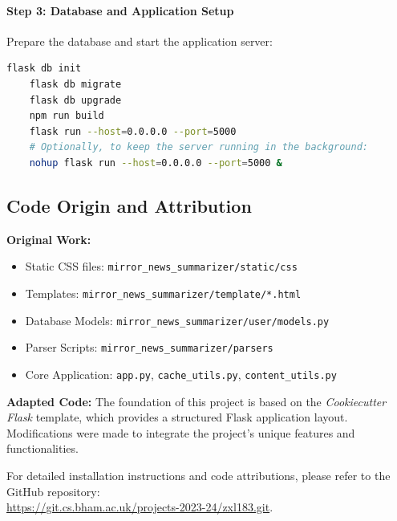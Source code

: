 \documentclass[10pt]{article}
\begin{document}
\begin{appendices}
    \paragraph{Step 3: Database and Application Setup}
    Prepare the database and start the application server:
    \begin{lstlisting}[language=bash]
    flask db init
    flask db migrate
    flask db upgrade
    npm run build
    flask run --host=0.0.0.0 --port=5000
    # Optionally, to keep the server running in the background:
    nohup flask run --host=0.0.0.0 --port=5000 &
    \end{lstlisting}
    
    \subsection{Code Origin and Attribution}
    \label{subsec:code_origin}
    
    \textbf{Original Work:}
    \begin{itemize}
        \item Static CSS files: \texttt{mirror\_news\_summarizer/static/css}
        \item Templates: \texttt{mirror\_news\_summarizer/template/*.html}
        \item Database Models: \texttt{mirror\_news\_summarizer/user/models.py}
        \item Parser Scripts: \texttt{mirror\_news\_summarizer/parsers}
        \item Core Application: \texttt{app.py}, \texttt{cache\_utils.py}, \texttt{content\_utils.py}
    \end{itemize}
    
    \textbf{Adapted Code:}
    The foundation of this project is based on the \textit{Cookiecutter Flask} template, which provides a structured Flask application layout. Modifications were made to integrate the project's unique features and functionalities.
    
    For detailed installation instructions and code attributions, please refer to the GitHub repository: \\ \href{https://git.cs.bham.ac.uk/projects-2023-24/zxl183.git}{https://git.cs.bham.ac.uk/projects-2023-24/zxl183.git}.
    
\end{appendices}
\end{document}

